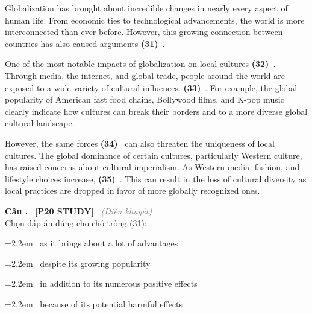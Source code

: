 \documentclass[12pt,a4paper,twoside]{article}
\newcounter{qcounter}
\newcommand{\question}[2][]{%
    \stepcounter{qcounter}%
    \par\vspace{6pt}%
    \noindent\textcolor{primaryBlue}{\textbf{Câu \theqcounter.}}~%
    \textcolor{secondaryBlue}{\small\textbf{[P20 STUDY]}}~%
    \if\relax\detokenize{#1}\relax\else\textcolor{gray}{\small\textit{(#1)}}~\fi\\[1pt]
    \noindent #2%
}
\newcommand{\choiceitem}[2]{%
    \tikz[baseline=-0.5ex]{%
        \node[draw=primaryBlue, circle, minimum size=1.5em, inner sep=0pt, thick] {\textbf{#1}};%
    }~#2%
}
\newenvironment{readingpassage}[1][]{%
    \begin{tcolorbox}[enhanced, colback=grayLight, colframe=secondaryBlue,
        coltitle=textDark, fonttitle=\bfseries, title={#1},
        rounded corners, arc=3mm, boxrule=1pt,
        left=15pt, right=15pt, top=10pt, bottom=10pt,
        breakable, before skip=10pt, after skip=10pt, drop fuzzy shadow]
    \setstretch{1.3}
}{\end{tcolorbox}}
\begin{document}
\begin{readingpassage}[]
Globalization has brought about incredible changes in nearly every aspect of human life. From economic ties to technological advancements, the world is more interconnected than ever before. However, this growing connection between countries has also caused arguments \textbf{(31)}~\underline{\hspace{1.3cm}}.

One of the most notable impacts of globalization on local cultures \textbf{(32)}~\underline{\hspace{1.3cm}}. Through media, the internet, and global trade, people around the world are exposed to a wide variety of cultural influences. \textbf{(33)}~\underline{\hspace{1.3cm}}. For example, the global popularity of American fast food chains, Bollywood films, and K-pop music clearly indicate how cultures can break their borders and to a more diverse global cultural landscape.

However, the same forces \textbf{(34)}~\underline{\hspace{1.3cm}} can also threaten the uniqueness of local cultures. The global dominance of certain cultures, particularly Western culture, has raised concerns about cultural imperialism. As Western media, fashion, and lifestyle choices increase, \textbf{(35)}~\underline{\hspace{1.3cm}}. This can result in the loss of cultural diversity as local practices are dropped in favor of more globally recognized ones.
\end{readingpassage}

\question[Điền khuyết]{Chọn đáp án đúng cho chỗ trống (31):}

\par\vspace{4pt}
\noindent\hangindent=2.2em\choiceitem{A}{as it brings about a lot of advantages}\par\vspace{4pt}
\noindent\hangindent=2.2em\choiceitem{B}{despite its growing popularity}\par\vspace{4pt}
\noindent\hangindent=2.2em\choiceitem{C}{in addition to its numerous positive effects}\par\vspace{4pt}
\noindent\hangindent=2.2em\choiceitem{D}{because of its potential harmful effects}\par\vspace{4pt}
\end{document}
